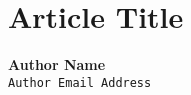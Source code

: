 \documentclass[abstract=on,twoside]{scrreprt}
\begin{document}
\chapter{Article Title} %
\thispagestyle{empty}
\vspace{-2cm}
\begin{flushright}
	\textbf{Author Name}\\ %
	\texttt{Author Email Address} %
\end{flushright}

\end{document}
